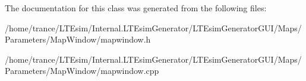 The documentation for this class was generated from the following files\+:\begin{DoxyCompactItemize}
\item 
/home/trance/\+L\+T\+Esim/\+Internal.\+L\+T\+Esim\+Generator/\+L\+T\+Esim\+Generator\+G\+U\+I/\+Maps/\+Parameters/\+Map\+Window/mapwindow.\+h\item 
/home/trance/\+L\+T\+Esim/\+Internal.\+L\+T\+Esim\+Generator/\+L\+T\+Esim\+Generator\+G\+U\+I/\+Maps/\+Parameters/\+Map\+Window/mapwindow.\+cpp\end{DoxyCompactItemize}
